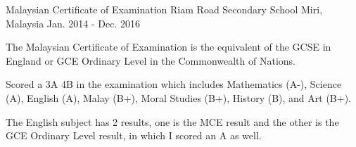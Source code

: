 

\begin{cventries}

  \cventry
    {Malaysian Certificate of Examination} %
    {Riam Road Secondary School} %
    {Miri, Malaysia} %
    {Jan. 2014 - Dec. 2016} %
    {
      \begin{cvitems} %
        \item {The Malaysian Certificate of Examination is the equivalent of the GCSE in England or GCE Ordinary Level in the Commonwealth of Nations.}
        \item {Scored a 3A 4B in the examination which includes Mathematics (A-), Science (A), English (A), Malay (B+), Moral Studies (B+), History (B), and Art (B+).}
        \item {The English subject has 2 results, one is the MCE result and the other is the GCE Ordinary Level result, in which I scored an A as well.}
      \end{cvitems}
    }
\end{cventries}
